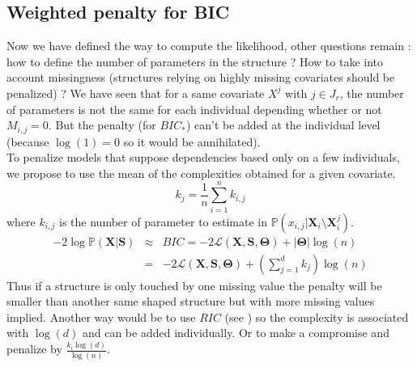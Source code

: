 \documentclass[12pt,a4paper]{report}
\begin{document}
%
%
	\subsection{Weighted penalty for BIC}
			Now we have defined the way to compute the likelihood, other questions remain : how to define the number of parameters in the structure ?		How to take into account missingness (structures relying on highly missing covariates should be penalized) ?
			We have seen that for a same covariate $X^j$ with $ j \in J_r$, the number of parameters is not the same for each individual depending whether or not $M_{i,j}=0$. But the penalty (for $BIC_*$) can't be added at the individual level (because $\log(1)=0$ so it would be annihilated). \\
			
			To penalize models that suppose dependencies based only on a few individuals, we propose to use the mean of the complexities obtained for a given covariate.
			\begin{equation}
			k_j=\frac{1}{n}\sum_{i=1}^nk_{i,j}
\end{equation}						where $k_{i,j}$ is the number of parameter to estimate in $\mathbb{P}(x_{i,j}|\boldsymbol{X}_i\setminus \boldsymbol{X}_i^j)$.
			\begin{eqnarray}
		-2\log \mathbb{P}(\boldsymbol{X}|\boldsymbol{S})&\approx & BIC=-2\mathcal{L}(\boldsymbol{X},\boldsymbol{S},\boldsymbol{\Theta})+|\boldsymbol{\Theta}|\log(n) \\
		&=& -2\mathcal{L}(\boldsymbol{X},\boldsymbol{S},\boldsymbol{\Theta})+(\sum_{j=1}^dk_j)\log(n)
	\end{eqnarray}
			 Thus if a structure is only touched by one missing value the penalty will be smaller than another same shaped structure but with more missing values implied.
			Another way would be to use $RIC$ (see \cite{foster1994risk}) so the complexity is associated with $\log(d)$ and can be added individually. Or to make a compromise and penalize by $\frac{k_i\log(d)}{\log(n)}$.
		
\end{document}
